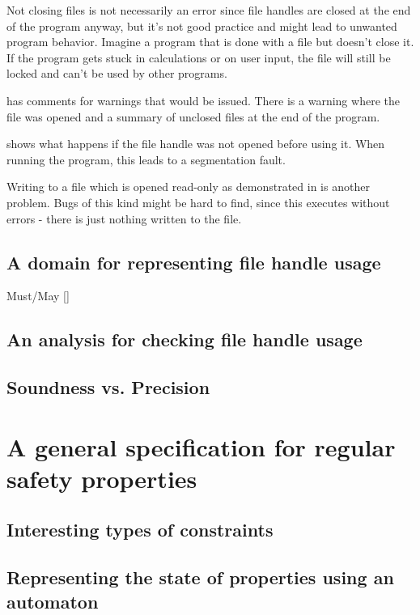 Not closing files is not necessarily an error since file handles are closed at the end of the program anyway, but it's not good practice and might lead to unwanted program behavior.
Imagine a program that is done with a file but doesn't close it. If the program gets stuck in calculations or on user input, the file will still be locked and can't be used by other programs.

 has comments for warnings that would be issued. There is a warning where the file was opened and a summary of unclosed files at the end of the program.

 shows what happens if the file handle was not opened before using it. When running the program, this leads to a segmentation fault.

Writing to a file which is opened read-only as demonstrated in  is another problem. Bugs of this kind might be hard to find, since this executes without errors - there is just nothing written to the file.



\section{A domain for representing file handle usage}
Must/May []

\section{An analysis for checking file handle usage}

\section{Soundness vs. Precision}


\chapter{A general specification for regular safety properties}
\section{Interesting types of constraints}

\section{Representing the state of properties using an automaton}

